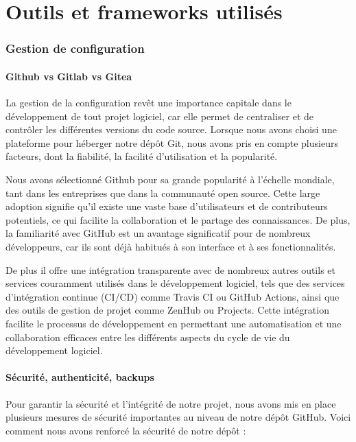 \documentclass[
	article,			%
	11pt,				%
	oneside,			%
	a4paper,			%
	chapter=TITLE,
	french,			%
	sumario=tradicional
	]{base_nt}
\begin{document}
\part{Outils et frameworks utilisés}

\section{Gestion de configuration}

\subsection{Github vs Gitlab vs Gitea}


La gestion de la configuration revêt une importance capitale dans le développement de tout projet logiciel, car elle permet de centraliser et de contrôler les différentes versions du code source. Lorsque nous avons choisi une plateforme pour héberger notre dépôt Git, nous avons pris en compte plusieurs facteurs, dont la fiabilité, la facilité d'utilisation et la popularité.

Nous avons sélectionné Github pour sa grande popularité à l'échelle mondiale, tant dans les entreprises que dans la communauté open source. Cette large adoption signifie qu'il existe une vaste base d'utilisateurs et de contributeurs potentiels, ce qui facilite la collaboration et le partage des connaissances. De plus, la familiarité avec GitHub est un avantage significatif pour de nombreux développeurs, car ils sont déjà habitués à son interface et à ses fonctionnalités.

De plus il offre une intégration transparente avec de nombreux autres outils et services couramment utilisés dans le développement logiciel, tels que des services d'intégration continue (CI/CD) comme Travis CI ou GitHub Actions, ainsi que des outils de gestion de projet comme ZenHub ou Projects. Cette intégration facilite le processus de développement en permettant une automatisation et une collaboration efficaces entre les différents aspects du cycle de vie du développement logiciel.

\newpage

\subsection{Sécurité, authenticité, backups}

Pour garantir la sécurité et l'intégrité de notre projet, nous avons mis en place plusieurs mesures de sécurité importantes au niveau de notre dépôt GitHub. Voici comment nous avons renforcé la sécurité de notre dépôt :
\end{document}
